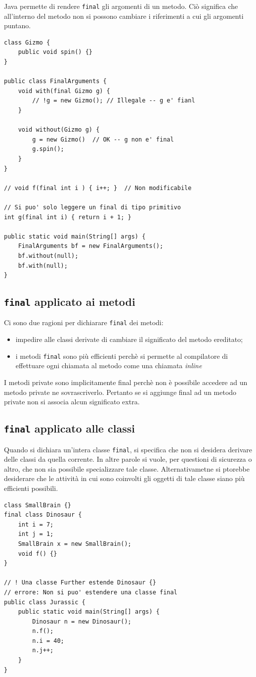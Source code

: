 \documentclass[12pt]{report}
\begin{document}
Java permette di rendere \texttt{final} gli argomenti di un metodo. Ciò significa che all'interno del metodo non si possono cambiare i riferimenti a cui gli argomenti puntano.
\begin{lstlisting}[style=javastyle]
class Gizmo {
	public void spin() {}
}

public class FinalArguments {
	void with(final Gizmo g) {
		// !g = new Gizmo(); // Illegale -- g e' fianl
	}

	void without(Gizmo g) {
		g = new Gizmo()  // OK -- g non e' final
		g.spin();
	}
}

// void f(final int i ) { i++; }  // Non modificabile

// Si puo' solo leggere un final di tipo primitivo
int g(final int i) { return i + 1; }

public static void main(String[] args) {
	FinalArguments bf = new FinalArguments();
	bf.without(null);
	bf.with(null);
}
\end{lstlisting}
\subsection{\texttt{final} applicato ai metodi}
Ci sono due ragioni per dichiarare \texttt{final} dei metodi:
\begin{itemize}
	\item impedire alle classi derivate di cambiare il significato del metodo ereditato;
	\item i metodi \texttt{final} sono più efficienti perchè si permette al compilatore di effettuare ogni chiamata al metodo come una chiamata \textit{inline}
\end{itemize}
I metodi private sono implicitamente final perchè non è possibile accedere ad un metodo private ne sovrascriverlo. Pertanto se si aggiunge final ad un metodo private non si associa alcun significato extra.
\subsection{\texttt{final} applicato alle classi}
Quando si dichiara un'intera classe \texttt{final}, si specifica che non si desidera derivare delle classi da quella corrente. In altre parole si vuole, per questioni di sicurezza o altro, che non sia possibile specializzare tale classe. Alternativametne si ptorebbe desiderare che le attività in cui sono coinvolti gli oggetti di tale classe siano più efficienti possibili.
\begin{lstlisting}[style=javastyle]
class SmallBrain {}
final class Dinosaur {
	int i = 7;
	int j = 1;
	SmallBrain x = new SmallBrain();
	void f() {}
}

// ! Una classe Further estende Dinosaur {}
// errore: Non si puo' estendere una classe final
public class Jurassic {
	public static void main(String[] args) {
		Dinosaur n = new Dinosaur();
		n.f();
		n.i = 40;
		n.j++;
	}
}
\end{lstlisting}
\end{document}
